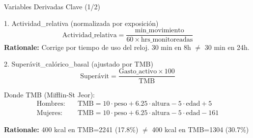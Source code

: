 \documentclass[aspectratio=169]{beamer}
\begin{document}
\begin{frame}{Variables Derivadas Clave (1/2)}

\begin{block}{1. Actividad\_relativa (normalizada por exposición)}
\begin{equation*}
\text{Actividad\_relativa} = \frac{\text{min\_movimiento}}{60 \times \text{hrs\_monitoreadas}}
\end{equation*}
\textbf{Rationale:} Corrige por tiempo de uso del reloj. 30 min en 8h $\neq$ 30 min en 24h.
\end{block}

\vspace{0.3cm}

\begin{block}{2. Superávit\_calórico\_basal (ajustado por TMB)}
\begin{equation*}
\text{Superávit} = \frac{\text{Gasto\_activo} \times 100}{\text{TMB}}
\end{equation*}

Donde TMB (Mifflin-St Jeor):
\begin{align*}
\text{Hombres:} & \quad \text{TMB} = 10 \cdot \text{peso} + 6.25 \cdot \text{altura} - 5 \cdot \text{edad} + 5 \\
\text{Mujeres:} & \quad \text{TMB} = 10 \cdot \text{peso} + 6.25 \cdot \text{altura} - 5 \cdot \text{edad} - 161
\end{align*}

\textbf{Rationale:} 400 kcal en TMB=2241 (17.8\%) $\neq$ 400 kcal en TMB=1304 (30.7\%)
\end{block}

\end{frame}

\end{document}
